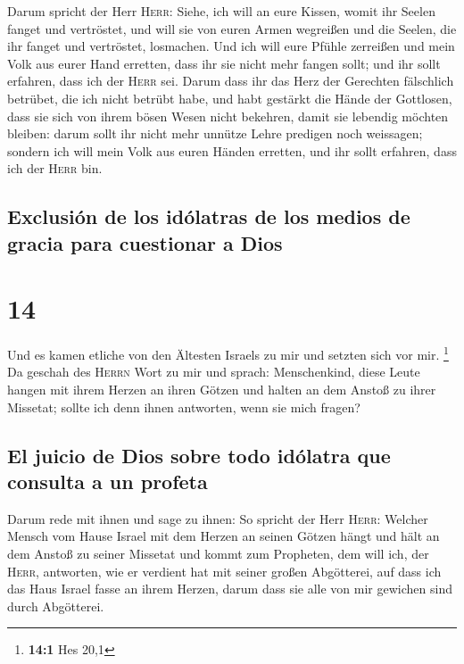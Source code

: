  Darum spricht der Herr \textsc{Herr}: Siehe, ich will an
eure Kissen, womit ihr Seelen fanget und vertröstet, und will sie von
euren Armen wegreißen und die Seelen, die ihr fanget und vertröstet,
losmachen.  Und ich will eure Pfühle zerreißen und mein
Volk aus eurer Hand erretten, dass ihr sie nicht mehr fangen sollt; und
ihr sollt erfahren, dass ich der \textsc{Herr} sei. 
Darum dass ihr das Herz der Gerechten fälschlich betrübet, die ich nicht
betrübt habe, und habt gestärkt die Hände der Gottlosen, dass sie sich
von ihrem bösen Wesen nicht bekehren, damit sie lebendig möchten
bleiben:  darum sollt ihr nicht mehr unnütze Lehre
predigen noch weissagen; sondern ich will mein Volk aus euren Händen
erretten, und ihr sollt erfahren, dass ich der \textsc{Herr} bin.

\hypertarget{exclusiuxf3n-de-los-iduxf3latras-de-los-medios-de-gracia-para-cuestionar-a-dios}{%
\subsection{Exclusión de los idólatras de los medios de gracia para
cuestionar a
Dios}\label{exclusiuxf3n-de-los-iduxf3latras-de-los-medios-de-gracia-para-cuestionar-a-dios}}

\hypertarget{section-13}{%
\section{14}\label{section-13}}

 Und es kamen etliche von den Ältesten Israels zu mir und
setzten sich vor mir. \footnote{\textbf{14:1} Hes 20,1} 
Da geschah des \textsc{Herrn} Wort zu mir und sprach: 
Menschenkind, diese Leute hangen mit ihrem Herzen an ihren Götzen und
halten an dem Anstoß zu ihrer Missetat; sollte ich denn ihnen antworten,
wenn sie mich fragen?

\hypertarget{el-juicio-de-dios-sobre-todo-iduxf3latra-que-consulta-a-un-profeta}{%
\subsection{El juicio de Dios sobre todo idólatra que consulta a un
profeta}\label{el-juicio-de-dios-sobre-todo-iduxf3latra-que-consulta-a-un-profeta}}

 Darum rede mit ihnen und sage zu ihnen: So spricht der
Herr \textsc{Herr}: Welcher Mensch vom Hause Israel mit dem Herzen an
seinen Götzen hängt und hält an dem Anstoß zu seiner Missetat und kommt
zum Propheten, dem will ich, der \textsc{Herr}, antworten, wie er
verdient hat mit seiner großen Abgötterei,  auf dass ich
das Haus Israel fasse an ihrem Herzen, darum dass sie alle von mir
gewichen sind durch Abgötterei.


